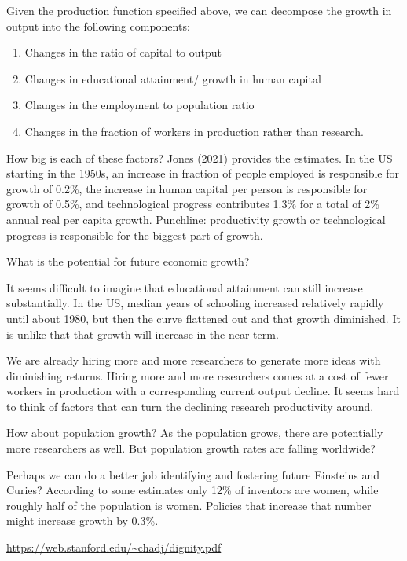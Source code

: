 \documentclass[
]{book}
\providecommand{\tightlist}{%
  \setlength{\itemsep}{0pt}\setlength{\parskip}{0pt}}
\begin{document}
Given the production function specified above, we can decompose the growth in output into the following components:

\begin{enumerate}
\def\labelenumi{\arabic{enumi}.}
\tightlist
\item
  Changes in the ratio of capital to output
\item
  Changes in educational attainment/ growth in human capital
\item
  Changes in the employment to population ratio
\item
  Changes in the fraction of workers in production rather than research.
\end{enumerate}

How big is each of these factors? Jones (2021) provides the estimates. In the US starting in the 1950s, an increase in fraction of people employed is responsible for growth of 0.2\%, the increase in human capital per person is responsible for growth of 0.5\%, and technological progress contributes 1.3\% for a total of 2\% annual real per capita growth. Punchline: productivity growth or technological progress is responsible for the biggest part of growth.

What is the potential for future economic growth?

It seems difficult to imagine that educational attainment can still increase substantially. In the US, median years of schooling increased relatively rapidly until about 1980, but then the curve flattened out and that growth diminished. It is unlike that that growth will increase in the near term.

We are already hiring more and more researchers to generate more ideas with diminishing returns. Hiring more and more researchers comes at a cost of fewer workers in production with a corresponding current output decline. It seems hard to think of factors that can turn the declining research productivity around.

How about population growth? As the population grows, there are potentially more researchers as well. But population growth rates are falling worldwide?

Perhaps we can do a better job identifying and fostering future Einsteins and Curies? According to some estimates only 12\% of inventors are women, while roughly half of the population is women. Policies that increase that number might increase growth by 0.3\%.

\url{https://web.stanford.edu/~chadj/dignity.pdf}
\end{document}
